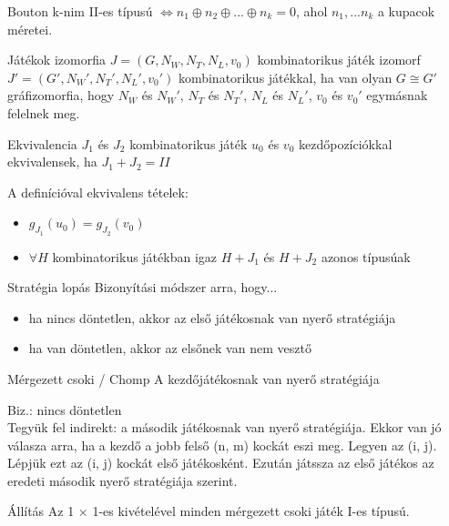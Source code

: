 	\begin{theorem}{Bouton}{}
		k-nim II-es típusú $\Leftrightarrow n_1 \oplus n_2 \oplus ... \oplus n_k = 0$, ahol $n_1, ... n_k$ a kupacok méretei.
	\end{theorem}
	
	\begin{definition}{Játékok izomorfia}{}
		$J = (G, N_W, N_T, N_L, v_0)$ kombinatorikus játék izomorf $J' = (G', N_W', N_T', N_L', v_0')$ kombinatorikus játékkal, ha van olyan $G \cong G'$ gráfizomorfia, hogy $N_W$ és $N_W'$, $N_T$ és $N_T'$, $N_L$ és $N_L'$, $v_0$ és $v_0'$ egymásnak felelnek meg.
	\end{definition}
	
	\begin{definition}{Ekvivalencia}{}
		$J_1$ és $J_2$ kombinatorikus játék $u_0$ és $v_0$ kezdőpozíciókkal ekvivalensek, ha $J_1 + J_2 = II$
		
	\end{definition}
	A definícióval ekvivalens tételek:  
	\begin{itemize}
		\item $g_{J_1}(u_0) = g_{J_2}(v_0)$
		\item $\forall H$ kombinatorikus játékban igaz $H + J_1$ és $H + J_2$ azonos típusúak
	\end{itemize}

	\begin{definition}{Stratégia lopás}{}
		Bizonyítási módszer arra, hogy...
		\begin{itemize}
			\item ha nincs döntetlen, akkor az első játékosnak van nyerő stratégiája
			\item ha van döntetlen, akkor az elsőnek van nem vesztő
		\end{itemize}
	\end{definition}
	
	\begin{theorem}{Mérgezett csoki / Chomp}{}
		A kezdőjátékosnak van nyerő stratégiája
	\end{theorem}
	
	Biz.: nincs döntetlen\\
	Tegyük fel indirekt: a második játékosnak van nyerő stratégiája. Ekkor van jó válasza arra, ha a kezdő a jobb felső (n, m) kockát eszi meg. Legyen az (i, j). Lépjük ezt az (i, j) kockát első játékosként. Ezután játssza az első játékos az eredeti második nyerő stratégiája szerint.
	
	\begin{statement}{Állítás}{}
		Az 1 × 1-es kivételével minden mérgezett csoki játék I-es típusú.
	\end{statement}
	
